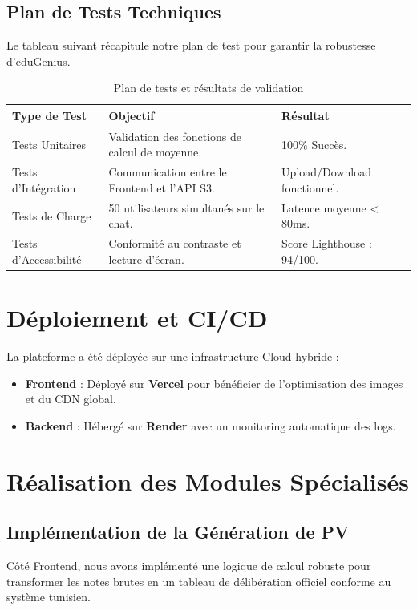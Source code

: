 \subsection{Plan de Tests Techniques}
Le tableau suivant récapitule notre plan de test pour garantir la robustesse d'eduGenius.

\begin{table}[H]
\centering
\begin{tabular}{|l|p{6cm}|p{6cm}|}
\hline
\textbf{Type de Test} & \textbf{Objectif} & \textbf{Résultat} \\ \hline
Tests Unitaires & Validation des fonctions de calcul de moyenne. & 100\% Succès. \\ \hline
Tests d'Intégration & Communication entre le Frontend et l'API S3. & Upload/Download fonctionnel. \\ \hline
Tests de Charge & 50 utilisateurs simultanés sur le chat. & Latence moyenne < 80ms. \\ \hline
Tests d'Accessibilité & Conformité au contraste et lecture d'écran. & Score Lighthouse : 94/100. \\ \hline
\end{tabular}
\caption{Plan de tests et résultats de validation}
\end{table}

\section{Déploiement et CI/CD}
La plateforme a été déployée sur une infrastructure Cloud hybride :
\begin{itemize}
    \item \textbf{Frontend} : Déployé sur \textbf{Vercel} pour bénéficier de l'optimisation des images et du CDN global.
    \item \textbf{Backend} : Hébergé sur \textbf{Render} avec un monitoring automatique des logs.
\end{itemize}
\section{Réalisation des Modules Spécialisés}

\subsection{Implémentation de la Génération de PV}
Côté Frontend, nous avons implémenté une logique de calcul robuste pour transformer les notes brutes en un tableau de délibération officiel conforme au système tunisien.

